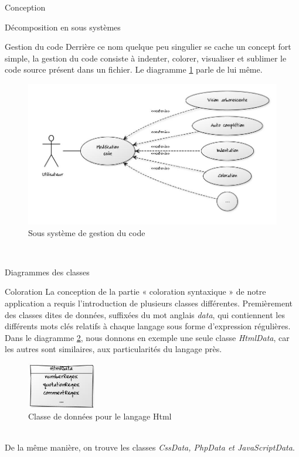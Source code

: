 \documentclass[a4paper, 12pt]{report}
\begin{document}
\begin{part}{Conception}
\begin{chapter}{Décomposition en sous systèmes}
			\begin{section}{Gestion du code}
				Derrière ce nom quelque peu singulier se cache un concept fort simple, la gestion du code consiste à indenter, colorer,
				visualiser et sublimer le code source présent dans un fichier. Le diagramme \ref{saphir} parle de lui même.
				\begin{figure}[ht]
					\begin{center}
						\includegraphics[width=13cm]{images/gestionCode.jpg}
						\caption{Sous système de gestion du code}
						\label{saphir}
					\end{center}
				\end{figure}~\\
			\end{section}
		\end{chapter}
		\begin{chapter}{Diagrammes des classes}
			\begin{section}{Coloration}
				La conception de la partie « coloration syntaxique » de notre application a requis l'introduction de plusieurs classes différentes.
				Premièrement des classes dites de données, suffixées du mot anglais \emph{data}, qui contiennent les différents mots clés relatifs
				à chaque langage sous forme d'\glspl{expression régulière}.\\
				Dans le diagramme \ref{blouson}, nous donnons en exemple une seule classe \emph{HtmlData}, car les autres sont similaires,
				aux particularités du langage près.
				\begin{figure}[ht]
					\begin{center}
						\includegraphics[width=3cm]{images/classesColorationData.jpg}
						\caption{Classe de données pour le langage Html}
						\label{blouson}
					\end{center}
				\end{figure}~\\
				De la même manière, on trouve les classes \emph{CssData, PhpData et JavaScriptData}.\\



\end{section}
\end{chapter}
\end{part}
\end{document}
